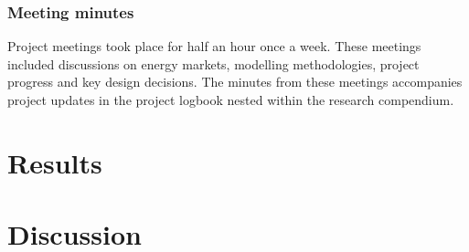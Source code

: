 \documentclass[10pt]{article}
\begin{document}
\subsubsection{Meeting minutes}
Project meetings took place for half an hour once a week. 
These meetings included discussions on energy markets, modelling methodologies, project progress and key design decisions.
The minutes from these meetings accompanies project updates in the project logbook nested within the research compendium.

\section{Results}

\section{Discussion}
\end{document}
